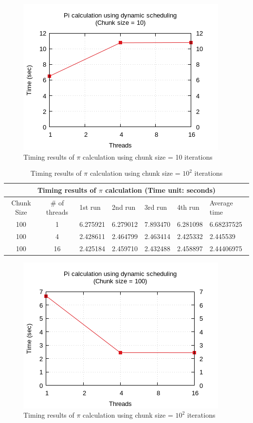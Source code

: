 \documentclass{article}
\begin{document}
\begin{figure}[htbp]
  \centering
  \includegraphics[width=0.55\columnwidth]{../../hw1/ex1/plots/pi_c10.png}
  \caption{Timing results of $\pi$ calculation using chunk size = 10 iterations}
\end{figure}


\begin{table}[htbp]
  \centering
    \begin{tabular}{|c c||l l l l| l|} 
    \hline
    \multicolumn{7}{|c|}{Timing results of $\pi$ calculation (Time unit: seconds)} \\
    \hline
    Chunk Size & \# of threads & 1st run & 2nd run & 3rd run & 4th run & Average time\\ [0.5ex] 
    \hline\hline
    100 & 1 & 6.275921 & 6.279012 & 7.893470 & 6.281098 & 6.68237525 \\
    \hline
    100 & 4 & 2.428611 & 2.464799 & 2.463414 & 2.425332 & 2.445539 \\
    \hline
    100 & 16 & 2.425184 & 2.459710 & 2.432488 & 2.458897 & 2.44406975 \\ [1ex]
    \hline
    \end{tabular}
  \caption{Timing results of $\pi$ calculation using chunk size = $10^2$ iterations}
\end{table}

\begin{figure}[htbp]
  \centering
  \includegraphics[width=0.55\columnwidth]{../../hw1/ex1/plots/pi_c100.png}
  \caption{Timing results of $\pi$ calculation using chunk size = $10^2$ iterations}
\end{figure}
\end{document}
